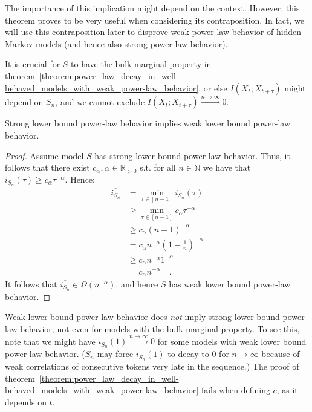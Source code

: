 \documentclass[../../main.tex]{subfiles}
\begin{document}
    \begin{remark}
        The importance of this implication might depend on the context. However, this theorem proves to be very useful when considering its contraposition. In fact, we will use this contraposition later to disprove weak power-law behavior of hidden Markov models (and hence also strong power-law behavior).
    \end{remark}

    \begin{remark}
        It is crucial for $S$ to have the bulk marginal property in theorem~\ref{theorem:power_law_decay_in_well-behaved_models_with_weak_power-law_behavior}, or else $I(X_{t}; X_{t + \tau})$ might depend on $S_n$, and we cannot exclude $I(X_{t}; X_{t + \tau}) \xrightarrow{n \to \infty} 0$.
    \end{remark}

\pagebreak
    \begin{proposition}
        \label{proposition:strong_slbplb_implies_wlbplb}
        Strong lower bound power-law behavior implies weak lower bound power-law behavior.
    \end{proposition}
    \vspace{-2.5em}
    \begin{proof}
        Assume model $S$ has strong lower bound power-law behavior. Thus, it follows that there exist $c_\alpha, \alpha \in \mathbb{R}_{>0}$ s.t. for all $n \in \mathbb{N}$ we have that $i_{S_n}(\tau) \geq c_\alpha \tau^{-\alpha}$. Hence:
        \begin{align*}
            \overline{i_{S_n}} &= \min_{\tau \in [n - 1]} i_{S_n}(\tau) \\
            &\geq \min_{\tau \in [n - 1]} c_\alpha \tau^{-\alpha} \\
            &\geq c_\alpha (n - 1)^{-\alpha} \\
            &= c_\alpha n^{-\alpha} (1 - \frac{1}{n})^{-\alpha} \\
            &\geq c_\alpha n^{-\alpha} 1^{-\alpha} \\
            &= c_\alpha n^{-\alpha} \quad .
        \end{align*}
        It follows that $\overline{i_{S_n}} \in \Omega(n^{-\alpha})$, and hence $S$ has weak lower bound power-law behavior.
    \end{proof}

    \begin{remark}
        Weak lower bound power-law behavior does \emph{not} imply strong lower bound power-law behavior, not even for models with the bulk marginal property. To see this, note that we might have  $i_{S_n}(1) \xrightarrow{n \to \infty} 0$ for some models with weak lower bound power-law behavior. ($S_n$ may force $i_{S_n}(1)$ to decay to $0$ for $n \to \infty$ because of weak correlations of consecutive tokens very late in the sequence.) The proof of theorem~\ref{theorem:power_law_decay_in_well-behaved_models_with_weak_power-law_behavior} fails when defining $c$, as it depends on $t$.
    \end{remark}
\end{document}
